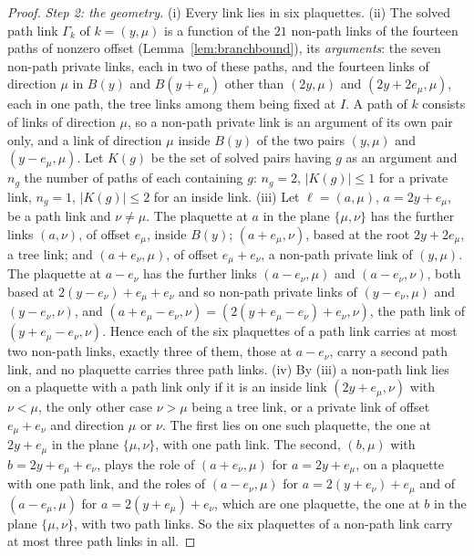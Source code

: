 \documentclass[11pt]{amsart}
\theoremstyle{definition}
\theoremstyle{remark}
\numberwithin{equation}{section}
\begin{document}
\begin{proof}
\emph{Step 2: the geometry.} (i) Every link lies in six plaquettes.
(ii) The solved path link $\Gamma_k$ of $k=(y,\mu)$ is a function of the
$21$ non-path links of the fourteen paths of nonzero offset
(Lemma~\ref{lem:branchbound}), its \emph{arguments}: the seven non-path
private links, each in two of these paths, and the fourteen links of
direction $\mu$ in $B(y)$ and $B(y+e_\mu)$ other than $(2y,\mu)$ and
$(2y+2e_\mu,\mu)$, each in one path, the tree links among them being
fixed at $I$. A path of $k$ consists of links of direction $\mu$, so a
non-path private link is an argument of its own pair only, and a link of
direction $\mu$ inside $B(y)$ of the two pairs $(y,\mu)$ and
$(y-e_\mu,\mu)$. Let $K(g)$ be the set of solved pairs having $g$ as an
argument and $n_g$ the number of paths of each containing $g$: $n_g=2$,
$\lvert K(g)\rvert\le1$ for a private link, $n_g=1$,
$\lvert K(g)\rvert\le2$ for an inside link.
(iii) Let $\ell=(a,\mu)$, $a=2y+e_\mu$, be a path link and $\nu\ne\mu$. The
plaquette at $a$ in the plane $\{\mu,\nu\}$ has the further links
$(a,\nu)$, of offset $e_\mu$, inside $B(y)$; $(a+e_\mu,\nu)$, based at
the root $2y+2e_\mu$, a tree link; and $(a+e_\nu,\mu)$, of offset
$e_\mu+e_\nu$, a non-path private link of $(y,\mu)$. The plaquette at
$a-e_\nu$ has the further links $(a-e_\nu,\mu)$ and $(a-e_\nu,\nu)$, both
based at $2(y-e_\nu)+e_\mu+e_\nu$ and so non-path private links of
$(y-e_\nu,\mu)$ and $(y-e_\nu,\nu)$, and $(a+e_\mu-e_\nu,\nu)=
(2(y+e_\mu-e_\nu)+e_\nu,\nu)$, the path link of $(y+e_\mu-e_\nu,\nu)$.
Hence each of the six plaquettes of a path link carries at most two
non-path links, exactly three of them, those at $a-e_\nu$, carry a
second path link, and no plaquette carries three path links.
(iv) By (iii) a non-path link lies on a plaquette with a path link only
if it is an inside link $(2y+e_\mu,\nu)$ with $\nu<\mu$, the only other
case $\nu>\mu$ being a tree link, or a private link of offset
$e_\mu+e_\nu$ and direction $\mu$ or $\nu$. The first lies on one such
plaquette, the one at $2y+e_\mu$ in the plane $\{\mu,\nu\}$, with one path
link. The second, $(b,\mu)$ with $b=2y+e_\mu+e_\nu$, plays the role of
$(a+e_\nu,\mu)$ for $a=2y+e_\mu$, on a plaquette with one path link, and
the roles of $(a-e_\nu,\mu)$ for $a=2(y+e_\nu)+e_\mu$ and of
$(a-e_\mu,\mu)$ for $a=2(y+e_\mu)+e_\nu$, which are one plaquette, the
one at $b$ in the plane $\{\mu,\nu\}$, with two path links. So the six
plaquettes of a non-path link carry at most three path links in all.


\end{proof}
\end{document}
